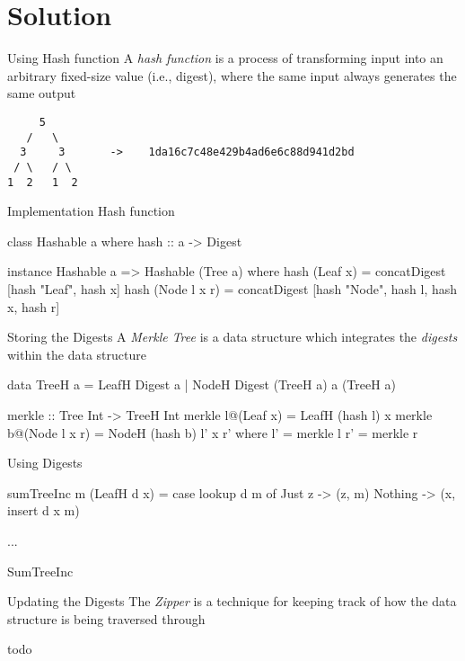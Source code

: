 \section{Solution}

\begin{slide}{Using Hash function}
A \textit{hash function} is a process of transforming input into an arbitrary fixed-size value (i.e., digest), where the same input always generates the same output

\begin{center}
\begin{verbatim}
     5 
   /   \
  3     3       ->    1da16c7c48e429b4ad6e6c88d941d2bd
 / \   / \
1  2   1  2
\end{verbatim}
\end{center}
\end{slide}

\begin{slide}{Implementation Hash function}
\begin{haskell}
class Hashable a where
  hash :: a -> Digest

instance Hashable a => Hashable (Tree a) where
  hash (Leaf x)     = concatDigest [hash "Leaf", hash x]
  hash (Node l x r) = concatDigest [hash "Node", hash l, hash x, hash r]
\end{haskell}
\end{slide}

\begin{slide}{Storing the Digests}
A \textit{Merkle Tree} is a data structure which integrates the \textit{digests} within the data structure

\vspace*{0.4cm}
\begin{haskell}
data TreeH a = LeafH Digest a
             | NodeH Digest (TreeH a) a (TreeH a)


merkle :: Tree Int -> TreeH Int
merkle l@(Leaf x)     = LeafH (hash l) x
merkle b@(Node l x r) = NodeH (hash b) l' x r'
  where
    l' = merkle l
    r' = merkle r
\end{haskell}
\end{slide}

\begin{slide}{Using Digests} 
\begin{haskell}
sumTreeInc m (LeafH d x) = case lookup d m of
  Just z  -> (z, m)
  Nothing -> (x, insert d x m)

...
\end{haskell}

\begin{haskell}
SumTreeInc 
\end{haskell}
\end{slide}

\begin{slide}{Updating the Digests}
The \textit{Zipper} is a technique for keeping track of how the data structure is being traversed through

\begin{haskell}
todo
\end{haskell}
\end{slide}